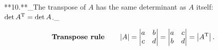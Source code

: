 **10.**_The transpose of \(A\) has the same determinant as \(A\) itself: \(\det A^{\rm T}=\det A\)._

\[\mbox{\bf Transpose rule}\qquad\left|A\right|=\begin{vmatrix}a&b\\ c&d\end{vmatrix}=\begin{vmatrix}a&c\\ b&d\end{vmatrix}=\left|A^{\rm T}\right|.\] 